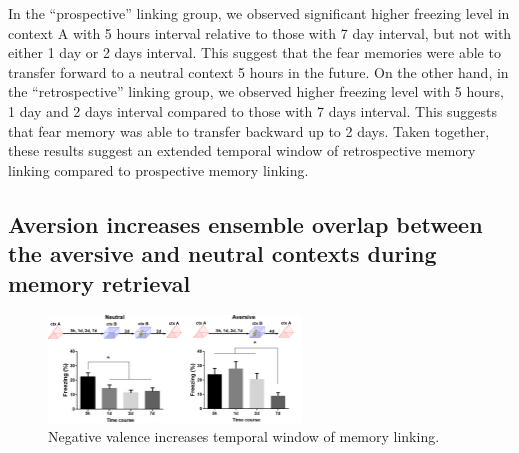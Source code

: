 \documentclass[master.tex]{subfiles}
\begin{document}
In the ``prospective'' linking group, we observed significant higher freezing
level in context A with 5 hours interval relative to those with 7 day interval,
but not with either 1 day or 2 days interval. This suggest that the fear
memories were able to transfer forward to a neutral context 5 hours in the
future. On the other hand, in the ``retrospective'' linking group, we observed
higher freezing level with 5 hours, 1 day and 2 days interval compared to those
with 7 days interval. This suggests that fear memory was able to transfer
backward up to 2 days. Taken together, these results suggest an extended
temporal window of retrospective memory linking compared to prospective memory
linking.

\subsection*{Aversion increases ensemble overlap between the aversive and
  neutral contexts during memory retrieval}

\begin{figure}
  \centering \includegraphics[width =
  0.6\textwidth]{Figures/val_retro_prelim.pdf}
  \caption{\footnotesize Negative valence increases temporal window of memory
    linking.}
  \label{fig:prelim_val}
\end{figure}
\end{document}
